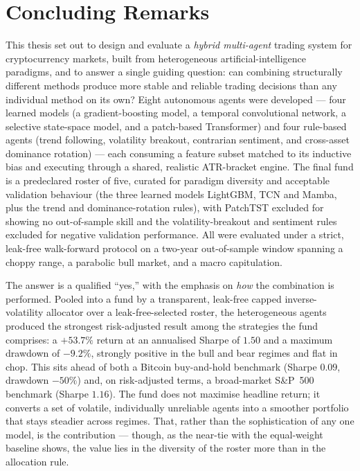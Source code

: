 

\chapter{Concluding Remarks}
\label{09_Concluding_Remarks}

This thesis set out to design and evaluate a \textit{hybrid multi-agent} trading system for cryptocurrency markets, built from heterogeneous artificial-intelligence paradigms, and to answer a single guiding question: can combining structurally different methods produce more stable and reliable trading decisions than any individual method on its own? Eight autonomous agents were developed --- four learned models (a gradient-boosting model, a temporal convolutional network, a selective state-space model, and a patch-based Transformer) and four rule-based agents (trend following, volatility breakout, contrarian sentiment, and cross-asset dominance rotation) --- each consuming a feature subset matched to its inductive bias and executing through a shared, realistic ATR-bracket engine. The final fund is a predeclared roster of five, curated for paradigm diversity and acceptable validation behaviour (the three learned models LightGBM, TCN and Mamba, plus the trend and dominance-rotation rules), with PatchTST excluded for showing no out-of-sample skill and the volatility-breakout and sentiment rules excluded for negative validation performance. All were evaluated under a strict, leak-free walk-forward protocol on a two-year out-of-sample window spanning a choppy range, a parabolic bull market, and a macro capitulation.


The answer is a qualified ``yes,'' with the emphasis on \textit{how} the combination is performed. Pooled into a fund by a transparent, leak-free capped inverse-volatility allocator over a leak-free-selected roster, the heterogeneous agents produced the strongest risk-adjusted result among the strategies the fund comprises: a $+53.7\%$ return at an annualised Sharpe of $1.50$ and a maximum drawdown of $-9.2\%$, strongly positive in the bull and bear regimes and flat in chop. This sits ahead of both a Bitcoin buy-and-hold benchmark (Sharpe $0.09$, drawdown $-50\%$) and, on risk-adjusted terms, a broad-market S\&P~500 benchmark (Sharpe $1.16$). The fund does not maximise headline return; it converts a set of volatile, individually unreliable agents into a smoother portfolio that stays steadier across regimes. That, rather than the sophistication of any one model, is the contribution --- though, as the near-tie with the equal-weight baseline shows, the value lies in the diversity of the roster more than in the allocation rule.


